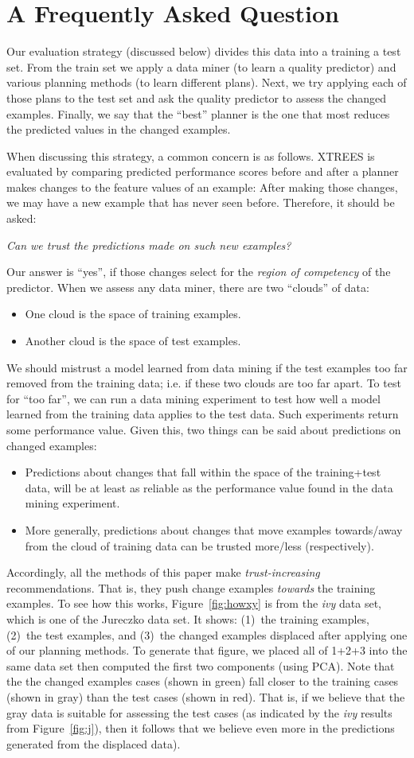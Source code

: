 \documentclass{sig-alternate}
\newcommand{\bi}{\begin{itemize}}
\newcommand{\ei}{\end{itemize}}
\newcommand{\fig}[1]{Figure~\ref{fig:#1}}
\begin{document}
\section{A Frequently Asked Question}


  Our evaluation strategy (discussed below) divides this data into a training a test set.
  From the train set we apply a data miner (to learn a quality predictor) and
  various planning methods (to learn different plans). Next, we try applying
  each of those plans to the  test set and ask the quality predictor to assess the changed examples.
  Finally, we say that the  ``best'' planner is the one that most reduces the predicted values
  in the changed examples.
  
When discussing this strategy, a common concern is as follows. XTREES is evaluated by  comparing
predicted performance scores before and after a planner makes changes to the feature values of an example:
After making those
changes, we may have a new example that has never seen before. Therefore, it should be asked:

{\centerline {\em Can we trust the predictions made on such new examples?}}

Our answer is ``yes'', if those changes select for the {\em region of competency} of the predictor. When we assess
any data miner, there are two ``clouds'' of data:
\bi
\item One cloud is the space of training examples.
\item Another cloud is the space of test examples.
\ei
We should mistrust a model learned from data mining if the test examples  too far removed from the training data; i.e. if
these two clouds are too far apart. To test for ``too far'', we can run a data mining experiment to test how well
a model learned from the training data applies to the test data. Such experiments return some performance value.
Given this, two things can be said about predictions on changed examples:
\bi
\item Predictions  about changes that  fall within the space of the training+test data, will be at least
as reliable as the performance value found in the data mining experiment.
\item More generally, predictions about changes that move examples towards/away from the cloud of training data can be trusted more/less (respectively).
\ei  
Accordingly, all the methods of this paper make {\em trust-increasing} recommendations. That is, they push change examples {\em towards} the
training examples.  To see how this works, 
 \fig{howxy} is from the {\em ivy} data
set, which is one of the Jureczko data set. It shows: (1)~the training examples, (2)~the test examples, and (3)~the
changed  examples displaced after applying one of our planning methods.
To generate that figure, we placed all of 1+2+3 into the same data set then computed the first
two  components (using PCA). Note that the  the   changed examples
cases  (shown in green)  fall closer to the training cases (shown in gray) than
the test cases (shown in red).  That is, if we believe
that the gray data is  suitable for assessing
the test cases (as indicated by the {\em ivy} results from \fig{j}), then it follows
that we believe even more in the predictions
generated from the displaced data).
\end{document}
